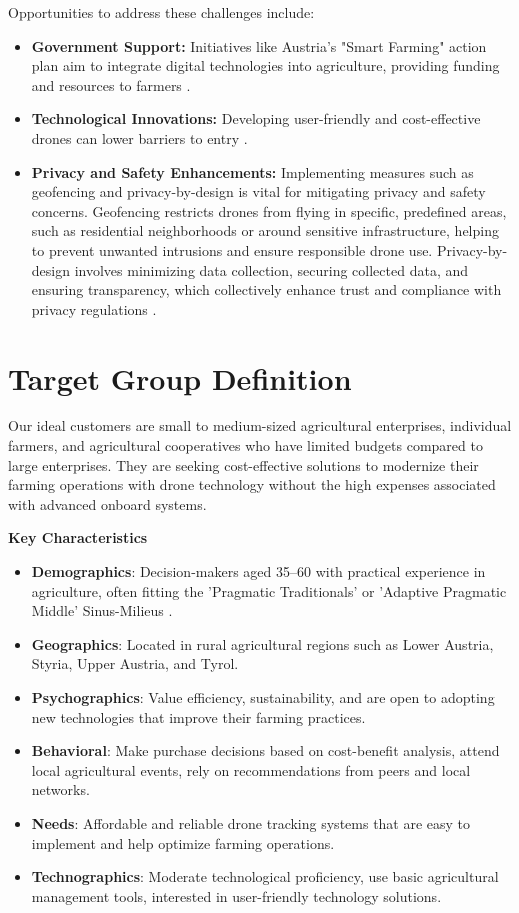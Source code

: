 Opportunities to address these challenges include:

\begin{itemize} 
	\item \textbf{Government Support:} Initiatives like Austria's "Smart Farming" action plan aim to integrate digital technologies into agriculture, providing funding and resources to farmers \citep{smartfarming2023}. 
	\item \textbf{Technological Innovations:} Developing user-friendly and cost-effective drones can lower barriers to entry \citep{guardianagriculture}. 
	\item \textbf{Privacy and Safety Enhancements:} Implementing measures such as geofencing and privacy-by-design is vital for mitigating privacy and safety concerns. Geofencing restricts drones from flying in specific, predefined areas, such as residential neighborhoods or around sensitive infrastructure, helping to prevent unwanted intrusions and ensure responsible drone use. Privacy-by-design involves minimizing data collection, securing collected data, and ensuring transparency, which collectively enhance trust and compliance with privacy regulations \citep{secure_redact_drones_privacy}. 
\end{itemize}

\section{Target Group Definition}

Our ideal customers are small to medium-sized agricultural enterprises, individual farmers, and agricultural cooperatives who have limited budgets compared to large enterprises. They are seeking cost-effective solutions to modernize their farming operations with drone technology without the high expenses associated with advanced onboard systems.

\textbf{Key Characteristics}

\begin{itemize}
	\item \textbf{Demographics}: Decision-makers aged 35--60 with practical experience in agriculture, often fitting the 'Pragmatic Traditionals' or 'Adaptive Pragmatic Middle' Sinus-Milieus \cite{sinus_institut_2024}. 
	\item \textbf{Geographics}: Located in rural agricultural regions such as Lower Austria, Styria, Upper Austria, and Tyrol. 
	\item \textbf{Psychographics}: Value efficiency, sustainability, and are open to adopting new technologies that improve their farming practices. 
	\item \textbf{Behavioral}: Make purchase decisions based on cost-benefit analysis, attend local agricultural events, rely on recommendations from peers and local networks. 
	\item \textbf{Needs}: Affordable and reliable drone tracking systems that are easy to implement and help optimize farming operations. 
	\item \textbf{Technographics}: Moderate technological proficiency, use basic agricultural management tools, interested in user-friendly technology solutions. 
\end{itemize}

